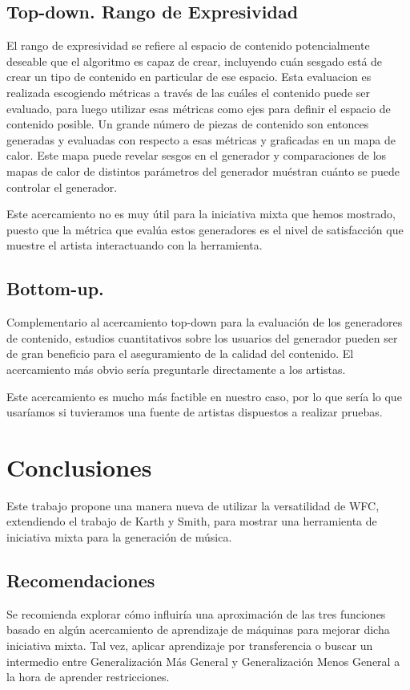 \documentclass[a4paper, 10pt]{article}
\begin{document}
	\subsection{Top-down. Rango de Expresividad}
	El rango de expresividad se refiere al espacio de contenido potencialmente
	deseable que el algoritmo es capaz de crear, incluyendo cuán sesgado está
	de crear un tipo de contenido en particular de ese espacio\cite{bib:5}.
	Esta evaluacion es realizada escogiendo métricas a través de las cuáles el contenido
	puede ser evaluado, para luego utilizar esas métricas como ejes para definir
	el espacio de contenido posible. Un grande número de piezas de contenido son
	entonces generadas y evaluadas con respecto a esas métricas y graficadas
	en un mapa de calor. Este mapa puede revelar sesgos en el generador y comparaciones
	de los mapas de calor de distintos parámetros del generador muéstran cuánto se
	puede controlar el generador.  

	Este acercamiento no es muy útil para la iniciativa mixta que hemos mostrado,
	puesto que la métrica que evalúa estos generadores es el nivel de satisfacción
	que muestre el artista interactuando con la herramienta.
	
	\subsection{Bottom-up. }
	Complementario al acercamiento top-down para la evaluación de los generadores
	de contenido, estudios cuantitativos sobre los usuarios del generador pueden 
	ser de gran beneficio para el aseguramiento de la calidad del contenido. El
	acercamiento más obvio sería preguntarle directamente a los artistas.

	Este acercamiento es mucho más factible en nuestro caso\cite{bib:4,bib:6},
	por lo que sería lo que usaríamos si tuvieramos una fuente de artistas dispuestos
	a realizar pruebas.
	

	\section{Conclusiones}
	Este trabajo propone una manera nueva de utilizar la versatilidad de WFC, extendiendo el
	trabajo de Karth y Smith, para mostrar una herramienta de iniciativa mixta para la generación
	de música.

	\subsection{Recomendaciones}
	Se recomienda explorar cómo influiría una aproximación de las tres funciones basado en algún
	acercamiento de aprendizaje de máquinas para mejorar dicha iniciativa mixta. Tal vez, aplicar
	aprendizaje por transferencia o buscar un intermedio entre Generalización Más General y 
	Generalización Menos General a la hora de aprender restricciones.


	
	
\end{document}
